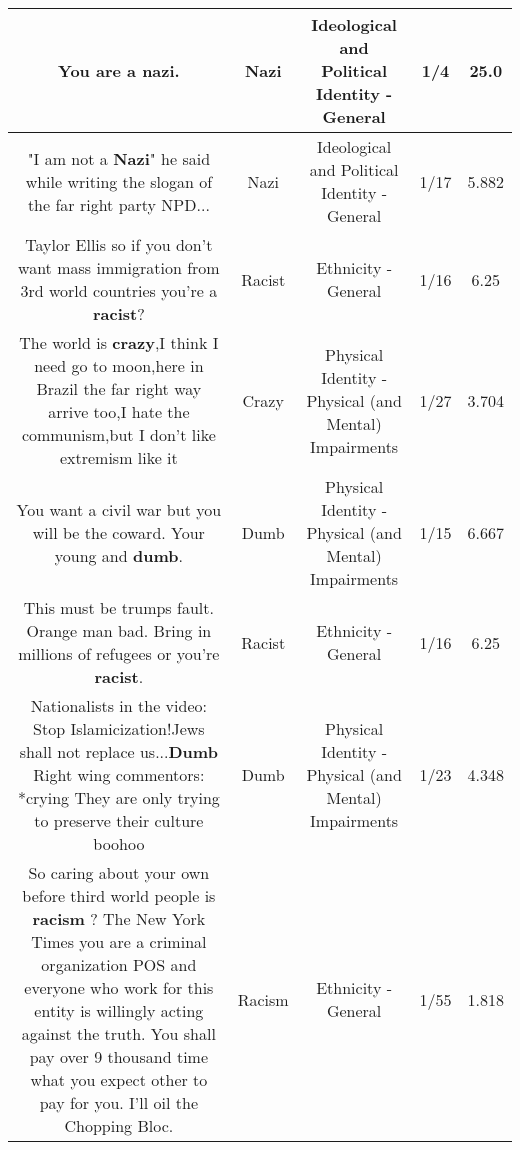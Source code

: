 \documentclass[11pt]{article}
\newlength\mylength
\begin{document}
\begin{center}
\begin{longtable}{|C{.65\mylength}|C{.30\mylength}|C{.12\mylength}|C{.12\mylength}|C{.12\mylength}|}
  \small You are a \textbf{nazi}.\normalsize   & Nazi &  Ideological and Political Identity - General & 1/4 & 25.0 \\  \hline
  \small "I am not a \textbf{Nazi}" he said while writing the slogan of the far right party NPD...\normalsize   & Nazi &  Ideological and Political Identity - General & 1/17 & 5.882 \\  \hline
  \small Taylor Ellis so if you don't want mass immigration from 3rd world countries you're a \textbf{racist}?\normalsize   & Racist & Ethnicity - General & 1/16 & 6.25 \\  \hline
  \small The world is \textbf{crazy},I think I need go to moon,here in Brazil the far right way arrive too,I hate the communism,but I don't like extremism like it\normalsize   & Crazy & Physical Identity - Physical (and Mental) Impairments & 1/27 & 3.704 \\  \hline
  \small You want a civil war but you will be the coward. Your young and \textbf{dumb}.\normalsize   & Dumb & Physical Identity - Physical (and Mental) Impairments & 1/15 & 6.667 \\  \hline
  \small This must be trumps fault.  Orange man bad.  Bring in millions of refugees or you're \textbf{racist}.\normalsize   & Racist & Ethnicity - General & 1/16 & 6.25 \\  \hline
  \small Nationalists in the video: Stop Islamicization!Jews shall not replace us...\textbf{Dumb} Right wing commentors: *crying They are only trying to preserve their culture boohoo\normalsize   & Dumb & Physical Identity - Physical (and Mental) Impairments & 1/23 & 4.348 \\  \hline
  \small So caring about your own before third world people is \textbf{racism} ? The New York Times you are a criminal organization POS and everyone who work for this entity is willingly acting against the truth. You shall pay over 9 thousand time what you expect other to pay for you. I'll oil the Chopping Bloc.\normalsize   & Racism & Ethnicity - General & 1/55 & 1.818 \\  \hline

\end{longtable}
\end{center}
\end{document}
